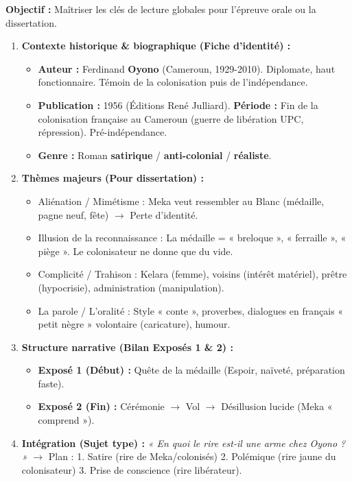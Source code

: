 \documentclass[11pt]{article}
\newcommand{\cle}[1]{{\popxbold\color{popdark}#1}}
\begin{document}
\begin{methode}
    \textbf{Objectif :} Maîtriser les clés de lecture globales pour l'épreuve orale ou la dissertation.
    \begin{enumerate}
        \item \textbf{Contexte historique \& biographique (Fiche d'identité) :}
              \begin{itemize}
                  \item \textbf{Auteur :} Ferdinand \textbf{Oyono} (Cameroun, 1929-2010). Diplomate, haut fonctionnaire. Témoin de la colonisation puis de l'indépendance.
                  \item \textbf{Publication :} 1956 (Éditions René Julliard). \textbf{Période :} Fin de la colonisation française au Cameroun (guerre de libération UPC, répression). Pré-indépendance.
                  \item \textbf{Genre :} Roman \textbf{satirique} / \textbf{anti-colonial} / \textbf{réaliste}.
              \end{itemize}
        \item \textbf{Thèmes majeurs (Pour dissertation) :}
              \begin{itemize}
                  \item \cle{Aliénation / Mimétisme :} Meka veut ressembler au Blanc (médaille, pagne neuf, fête) $\rightarrow$ Perte d'identité.
                  \item \cle{Illusion de la reconnaissance :} La médaille = « breloque », « ferraille », « piège ». Le colonisateur ne donne que du vide.
                  \item \cle{Complicité / Trahison :} Kelara (femme), voisins (intérêt matériel), prêtre (hypocrisie), administration (manipulation).
                  \item \cle{La parole / L'oralité :} Style « conte », proverbes, dialogues en français « petit nègre » volontaire (caricature), humour.
              \end{itemize}
        \item \textbf{Structure narrative (Bilan Exposés 1 \& 2) :}
              \begin{itemize}
                  \item \textbf{Exposé 1 (Début) :} Quête de la médaille (Espoir, naïveté, préparation faste).
                  \item \textbf{Exposé 2 (Fin) :} Cérémonie $\rightarrow$ Vol $\rightarrow$ Désillusion lucide (Meka « comprend »).
              \end{itemize}
        \item \textbf{Intégration (Sujet type) :} \emph{« En quoi le rire est-il une arme chez Oyono ? »} $\rightarrow$ Plan : 1. Satire (rire de Meka/colonisés) 2. Polémique (rire jaune du colonisateur) 3. Prise de conscience (rire libérateur).
    \end{enumerate}
\end{methode}
\end{document}
